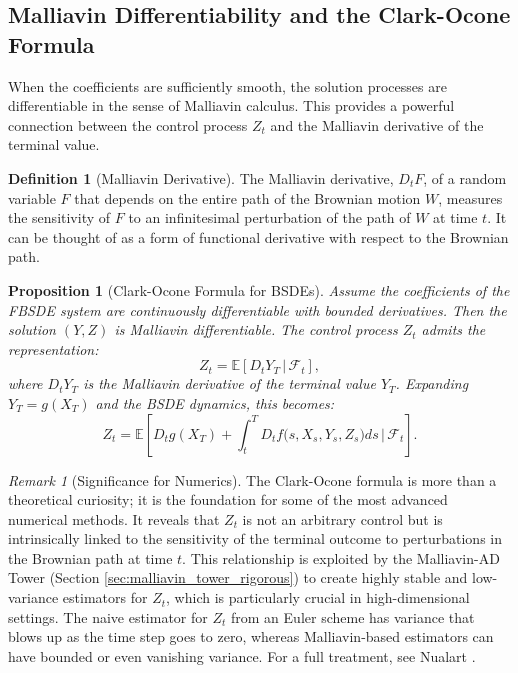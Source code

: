 \documentclass[11pt,letterpaper,oneside]{article}
\theoremstyle{plain}
\newtheorem{proposition}[theorem]{Proposition}
\theoremstyle{definition}
\newtheorem{definition}[theorem]{Definition}
\theoremstyle{remark}
\newtheorem{remark}{Remark}[section]
\begin{document}
\subsection{Malliavin Differentiability and the Clark-Ocone Formula}
\label{sec:malliavin_clark_ocone}

When the coefficients are sufficiently smooth, the solution processes are differentiable in the sense of Malliavin calculus. This provides a powerful connection between the control process \(Z_t\) and the Malliavin derivative of the terminal value.

\begin{definition}[Malliavin Derivative]
The Malliavin derivative, \(D_t F\), of a random variable \(F\) that depends on the entire path of the Brownian motion \(W\), measures the sensitivity of \(F\) to an infinitesimal perturbation of the path of \(W\) at time \(t\). It can be thought of as a form of functional derivative with respect to the Brownian path.
\end{definition}

\begin{proposition}[Clark-Ocone Formula for BSDEs]
\label{prop:clark_ocone}
Assume the coefficients of the FBSDE system are continuously differentiable with bounded derivatives. Then the solution \((Y,Z)\) is Malliavin differentiable. The control process \(Z_t\) admits the representation:
\[
  Z_t = \mathbb E\!\left[
      D_t Y_T
      \,\Big|\,\mathcal F_t\right],
\]
where \(D_t Y_T\) is the Malliavin derivative of the terminal value \(Y_T\). Expanding \(Y_T = g(X_T)\) and the BSDE dynamics, this becomes:
\[
  Z_t = \mathbb E\!\left[
      D_t g(X_T)
      +\int_t^T D_t f\bigl(s,X_s,Y_s,Z_s\bigr) ds
      \,\Big|\,\mathcal F_t\right].
\]
\end{proposition}

\begin{remark}[Significance for Numerics]
The Clark-Ocone formula is more than a theoretical curiosity; it is the foundation for some of the most advanced numerical methods. It reveals that \(Z_t\) is not an arbitrary control but is intrinsically linked to the sensitivity of the terminal outcome to perturbations in the Brownian path at time \(t\). This relationship is exploited by the Malliavin-AD Tower (Section \ref{sec:malliavin_tower_rigorous}) to create highly stable and low-variance estimators for \(Z_t\), which is particularly crucial in high-dimensional settings. The naive estimator for \(Z_t\) from an Euler scheme has variance that blows up as the time step goes to zero, whereas Malliavin-based estimators can have bounded or even vanishing variance. For a full treatment, see Nualart \cite{Nualart2006}.
\end{remark}
\end{document}
